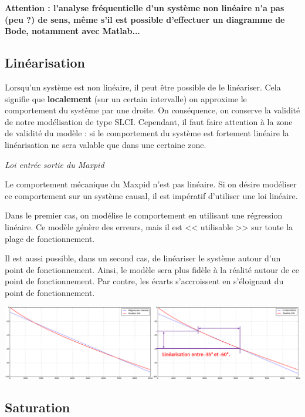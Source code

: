 \documentclass[10pt,fleqn]{article} %
\begin{document}
\textbf{Attention : l'analyse fréquentielle d'un système non linéaire n'a pas (peu ?) de sens, même s'il est possible d'effectuer un diagramme de Bode, notamment avec Matlab...}

\subsection{Linéarisation}
Lorsqu'un système est non linéaire, il peut être possible de le linéariser. Cela signifie que \textbf{localement} (sur un certain intervalle) on approxime le comportement du système par une droite. On conséquence, on conserve la validité de notre modélisation de type SLCI. Cependant, il faut faire attention à la zone de validité du modèle : si le comportement du système est fortement linéaire la linéarisation ne sera valable que dans une certaine zone.

\begin{exemple}
\textit{Loi entrée sortie du Maxpid}

Le comportement mécanique du Maxpid n'est pas linéaire. Si on désire modéliser ce comportement sur un système causal, il est impératif d'utiliser une loi linéaire. 

Dans le premier cas, on modélise le comportement en utilisant une régression linéaire. 
Ce modèle génère des erreurs, mais il est << utilisable >> sur toute la plage de fonctionnement. 

Il est aussi possible, dans un second cas, de linéariser le système autour d'un point de fonctionnement. Ainsi, le modèle sera plus fidèle à la réalité autour de ce point de fonctionnement. Par contre, les écarts s'accroissent en s'éloignant du point de fonctionnement. 

\begin{center}
\includegraphics[width=.9\linewidth]{images/Maxpid_linearisation}
\end{center}


\end{exemple}

\subsection{Saturation}
\end{document}
